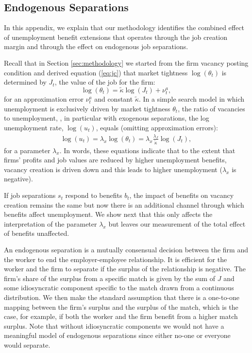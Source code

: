 \documentclass[12pt]{article}
\newcommand{\1}{\mathbf{1}}
\newcommand{\beq}{\begin{eqnarray}}
\newcommand{\eeq}{\end{eqnarray}}
\begin{document}
\begin{appendix}
\FloatBarrier

\clearpage

\clearpage
\section{Endogenous Separations}
\label{app:end_sep}

In this appendix, we explain that our methodology identifies the combined effect of unemployment benefit extensions that operates through the job creation margin and through the effect on endogenous job separations.

Recall that in Section \ref{sec:methodology} we started from the firm vacancy posting condition and derived equation (\ref{eq:jc}) that market tightness  
$\log(\theta_t)$ is determined by  $J_t$, the value of the job for the firm:
\begin{equation}
\log(\theta_t)=\tilde{\kappa} \log(J_t) + \nu^a_t,
\end{equation}
for an approximation error $\nu^a_t$ and constant $\tilde{\kappa}$.
In a simple search model in which unemployment is exclusively driven by market tightness $\theta_t$, the ratio of vacancies to unemployment, \citep{pissarides:00}, in particular with exogenous separations, the log unemployment rate, $\log(u_t)$, equals (omitting approximation errors):
\beq\label{eq:fec}
\log(u_t) =  \lambda_x \log(\theta_t) = \lambda_x \frac{\lambda_J}{\tilde{\kappa}} \log(J_t),
\eeq
for a parameter $\lambda_x$. In words, these equations indicate that to the extent that firms' profits and job values are reduced by higher unemployment benefits, vacancy creation is driven down and this leads to higher unemployment ($\lambda_x$ is negative).

If job separations $s_t$ respond to benefits $b_t$, the impact of benefits on vacancy creation remains the same but now there is an additional channel through which benefits affect unemployment. We show next that this only affects the interpretation of the parameter $\lambda_x$ but leaves our measurement of the total effect of benefits unaffected.

An endogenous separation is a mutually consensual decision between the firm and the worker to end the employer-employee relationship. It is efficient for the worker and the firm to separate if the surplus of the relationship is negative. 
The firm's share of the surplus from a specific match is given by the sum of $J$ and some idiosyncratic component specific to the match drawn from a continuous distribution.
We then make the standard assumption that there is a one-to-one mapping between the firm's surplus and the surplus of the match, which is the case, for example, if both the worker and the firm benefit from a higher match surplus.
Note that without idiosyncratic components we would not have a meaningful model of endogenous separations since either no-one or everyone would separate.




\end{appendix}
\end{document}
